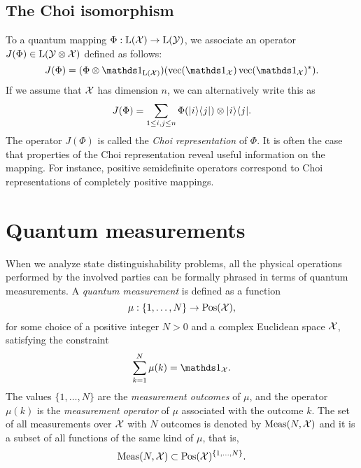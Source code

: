 \subsection{The Choi isomorphism}
\label{sec:choi-isomorphism}

To a quantum mapping $\Phi : \mathrm{L}(\mathcal{X})\rightarrow\mathrm{L}(\mathcal{Y})$, we associate an 
operator $J(\Phi) \in \mathrm{L}(\mathcal{Y}\otimes\mathcal{X})$ defined as follows:
\begin{equation}
\label{eq:choi-operator}
  J(\Phi) = (\Phi\otimes\I_{\Lin(\X)})(\vec(\I_{\X})\vec(\I_{\X})^{\ast}).
\end{equation}
If we assume that $\mathcal{X}$ has dimension $n$, we can alternatively write this as
\begin{equation}
  J(\Phi) = \sum_{1\leq i,j \leq n}\Phi(\lvert\mspace{0.5mu} i \mspace{0.5mu} \rangle\langle\mspace{0.5mu} j \mspace{0.5mu} \rvert)\otimes\lvert\mspace{0.5mu} i \mspace{0.5mu} \rangle\langle\mspace{0.5mu} j \mspace{0.5mu} \rvert.
\end{equation}
The operator $J(\Phi)$ is called the \emph{Choi representation}
of $\Phi$.
It is often the case that properties of the Choi representation reveal useful information 
on the mapping. For instance, positive semidefinite operators correspond to Choi representations 
of completely positive mappings.

\section{Quantum measurements}
\label{sec:quantum-measurements}
When we analyze state distinguishability problems, all the physical operations
performed by the involved parties can be formally phrased in terms of quantum 
measurements. 
A \emph{quantum measurement} is defined as a function 
\begin{equation}
\label{eq:def-measurement}
  \mu : \{ 1, \ldots, N \} \rightarrow \mathrm{Pos}(\mathcal{X}),
\end{equation}
for some choice of a positive integer $N > 0$ and a complex Euclidean space $\mathcal{X}$, 
satisfying the constraint
\begin{equation}
\label{eq:measurement-sum}
  \sum_{k=1}^{N} \mu(k) = \I_{\X}.
\end{equation}
The values $\{1, \ldots, N\}$ are the \emph{measurement outcomes} of $\mu$,
and the operator $\mu(k)$ is the \emph{measurement operator} of $\mu$ 
associated with the outcome $k$.
The set of all measurements over $\mathcal{X}$ with $N$ outcomes is denoted by 
$\mathrm{Meas}(N, \mathcal{X})$ and it is a subset of all functions of the same kind of $\mu$, that is,
\begin{equation}
  \mathrm{Meas}(N, \mathcal{X}) \subset \mathrm{Pos}(\mathcal{X})^{\{1,\ldots,N\}}.
\end{equation}

